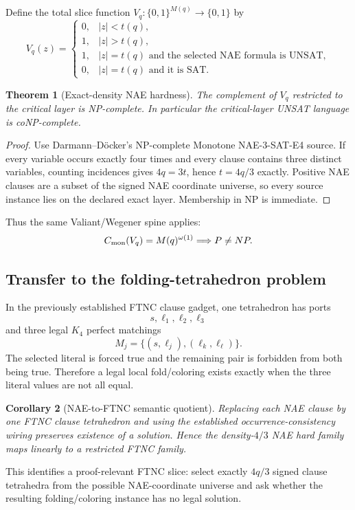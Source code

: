 \documentclass[11pt]{article}
\newtheorem{theorem}{Theorem}
\newtheorem{corollary}[theorem]{Corollary}
\begin{document}
Define the total slice function $V_q:\{0,1\}^{M(q)}\to\{0,1\}$ by
\[
V_q(z)=
\begin{cases}
0,&|z|<t(q),\\
1,&|z|>t(q),\\
1,&|z|=t(q)\text{ and the selected NAE formula is UNSAT},\\
0,&|z|=t(q)\text{ and it is SAT}.
\end{cases}
\]

\begin{theorem}[Exact-density NAE hardness]
The complement of $V_q$ restricted to the critical layer is NP-complete. In particular the critical-layer UNSAT language is coNP-complete.
\end{theorem}
\begin{proof}
Use Darmann--D\"ocker's NP-complete Monotone NAE-3-SAT-E4 source. If every variable occurs exactly four times and every clause contains three distinct variables, counting incidences gives $4q=3t$, hence $t=4q/3$ exactly. Positive NAE clauses are a subset of the signed NAE coordinate universe, so every source instance lies on the declared exact layer. Membership in NP is immediate.
\end{proof}

Thus the same Valiant/Wegener spine applies:
\[
C_{\rm mon}(V_q)=M(q)^{\omega(1)}
\Longrightarrow
P\ne NP.
\]

\subsection{Transfer to the folding-tetrahedron problem}
In the previously established FTNC clause gadget, one tetrahedron has ports
\[
s,\ell_1,\ell_2,\ell_3
\]
and three legal $K_4$ perfect matchings
\[
M_j=\{(s,\ell_j),(\ell_k,\ell_\ell)\}.
\]
The selected literal is forced true and the remaining pair is forbidden from both being true. Therefore a legal local fold/coloring exists exactly when the three literal values are not all equal.

\begin{corollary}[NAE-to-FTNC semantic quotient]
Replacing each NAE clause by one FTNC clause tetrahedron and using the established occurrence-consistency wiring preserves existence of a solution. Hence the density-$4/3$ NAE hard family maps linearly to a restricted FTNC family.
\end{corollary}

This identifies a proof-relevant FTNC slice: select exactly $4q/3$ signed clause tetrahedra from the possible NAE-coordinate universe and ask whether the resulting folding/coloring instance has no legal solution.
\end{document}
